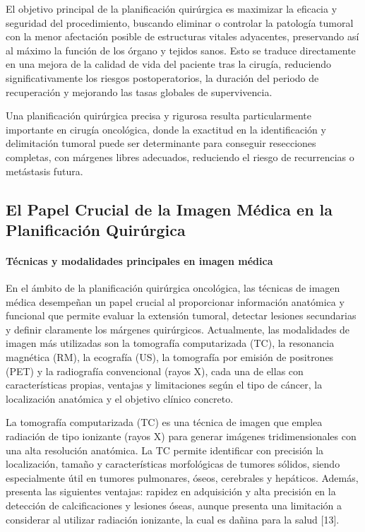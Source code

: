 El objetivo principal de la planificación quirúrgica es maximizar la eficacia y seguridad del procedimiento, buscando eliminar o controlar la patología tumoral con la menor afectación posible de estructuras vitales adyacentes, preservando así al máximo la función de los órgano y tejidos sanos. Esto se traduce directamente en una mejora de la calidad de vida del paciente tras la cirugía, reduciendo significativamente los riesgos postoperatorios, la duración del periodo de recuperación y mejorando las tasas globales de supervivencia\cite{Birkmeyer2012}. 

Una planificación quirúrgica precisa y rigurosa resulta particularmente importante en cirugía oncológica, donde la exactitud en la identificación y delimitación tumoral puede ser determinante para conseguir resecciones completas, con márgenes libres adecuados, reduciendo el riesgo de recurrencias o metástasis futura\cite{NCCN2023}.

\subsection{El Papel Crucial de la Imagen Médica en la Planificación Quirúrgica}
\label{sec:medical-image-surgical-planning}

 

\paragraph{Técnicas y modalidades principales en imagen médica} 

En el ámbito de la planificación quirúrgica oncológica, las técnicas de imagen médica desempeñan un papel crucial al proporcionar información anatómica y funcional que permite evaluar la extensión tumoral, detectar lesiones secundarias y definir claramente los márgenes quirúrgicos. Actualmente, las modalidades de imagen más utilizadas son la tomografía computarizada (TC), la resonancia magnética (RM), la ecografía (US), la tomografía por emisión de positrones (PET) y la radiografía convencional (rayos X), cada una de ellas con características propias, ventajas y limitaciones según el tipo de cáncer, la localización anatómica y el objetivo clínico concreto. 

La tomografía computarizada (TC) es una técnica de imagen que emplea radiación de tipo ionizante (rayos X) para generar imágenes tridimensionales con una alta resolución anatómica. La TC permite identificar con precisión la localización, tamaño y características morfológicas de tumores sólidos, siendo especialmente útil en tumores pulmonares, óseos, cerebrales y hepáticos. Además, presenta las siguientes ventajas:  rapidez en adquisición y alta precisión en la detección de calcificaciones y lesiones óseas, aunque presenta una limitación a considerar al utilizar radiación ionizante, la cual es dañina para la salud [13]. 

